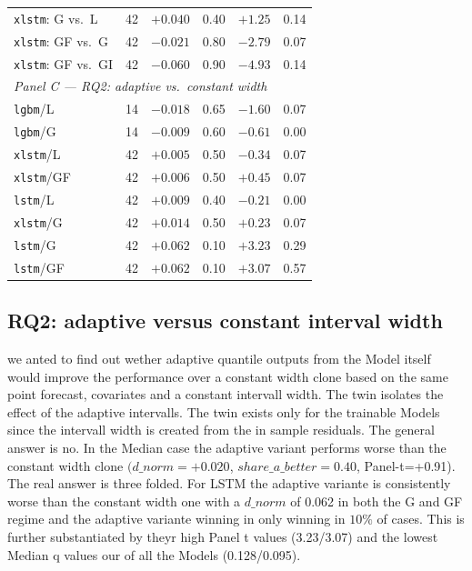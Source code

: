 \begin{table}[t]
\begin{tabular}{lrrrrr}
\texttt{xlstm}: G vs.\ L     & 42 & $+0.040$ & 0.40 & $+1.25$ & 0.14 \\
\texttt{xlstm}: GF vs.\ G    & 42 & $-0.021$ & 0.80 & $-2.79$ & 0.07 \\
\texttt{xlstm}: GF vs.\ GI   & 42 & $-0.060$ & 0.90 & $-4.93$ & 0.14 \\
\midrule
\multicolumn{6}{l}{\emph{Panel C --- RQ2: adaptive vs.\ constant width}} \\
\texttt{lgbm}/L    & 14 & $-0.018$ & 0.65 & $-1.60$ & 0.07 \\
\texttt{lgbm}/G    & 14 & $-0.009$ & 0.60 & $-0.61$ & 0.00 \\
\texttt{xlstm}/L   & 42 & $+0.005$ & 0.50 & $-0.34$ & 0.07 \\
\texttt{xlstm}/GF  & 42 & $+0.006$ & 0.50 & $+0.45$ & 0.07 \\
\texttt{lstm}/L    & 42 & $+0.009$ & 0.40 & $-0.21$ & 0.00 \\
\texttt{xlstm}/G   & 42 & $+0.014$ & 0.50 & $+0.23$ & 0.07 \\
\texttt{lstm}/G    & 42 & $+0.062$ & 0.10 & $+3.23$ & 0.29 \\
\texttt{lstm}/GF   & 42 & $+0.062$ & 0.10 & $+3.07$ & 0.57 \\
\bottomrule
\end{tabular}
\end{table}


\subsection{RQ2: adaptive versus constant interval width}
\label{sec:res:rq2}
we anted to find out wether adaptive quantile outputs from the Model itself would improve the performance over a constant width clone based on the same point forecast, covariates and a constant intervall width. The twin isolates the effect of the adaptive intervalls. The twin exists only for the trainable Models since the intervall width is created from the in sample residuals. The general answer is no. In the Median case the adaptive variant performs worse than the constant width clone $(d\_norm=+0.020$, $share\_a\_better=0.40$, Panel-t=+0.91). \\

The real answer is three folded. For LSTM the adaptive variante is consistently worse than the constant width one with a $d\_norm$ of 0.062 in both the G and GF regime and the adaptive variante winning in only winning in $10\%$ of cases. This is further substantiated by theyr high Panel t values (3.23/3.07) and the lowest Median q values our of all the Models (0.128/0.095).\\

